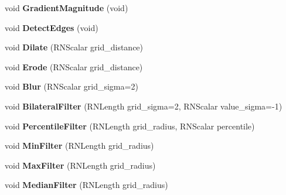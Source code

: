 \begin{DoxyCompactItemize}
\item 
void {\bfseries Gradient\+Magnitude} (void)\hypertarget{class_r3_grid_ac3e7a5b7c4e57a3df01e0b3df49c1ae5}{}\label{class_r3_grid_ac3e7a5b7c4e57a3df01e0b3df49c1ae5}

\item 
void {\bfseries Detect\+Edges} (void)\hypertarget{class_r3_grid_ac28e72ecc029f51ba86351f652d388b7}{}\label{class_r3_grid_ac28e72ecc029f51ba86351f652d388b7}

\item 
void {\bfseries Dilate} (R\+N\+Scalar grid\+\_\+distance)\hypertarget{class_r3_grid_a8adc3216f57c35fca6cc334658222073}{}\label{class_r3_grid_a8adc3216f57c35fca6cc334658222073}

\item 
void {\bfseries Erode} (R\+N\+Scalar grid\+\_\+distance)\hypertarget{class_r3_grid_a053615b5dfd296d03de9d3342a5bd69b}{}\label{class_r3_grid_a053615b5dfd296d03de9d3342a5bd69b}

\item 
void {\bfseries Blur} (R\+N\+Scalar grid\+\_\+sigma=2)\hypertarget{class_r3_grid_a173ed5e2e752422fd12fc560fe0d8d70}{}\label{class_r3_grid_a173ed5e2e752422fd12fc560fe0d8d70}

\item 
void {\bfseries Bilateral\+Filter} (R\+N\+Length grid\+\_\+sigma=2, R\+N\+Scalar value\+\_\+sigma=-\/1)\hypertarget{class_r3_grid_a1316c3649f21bd00e1ca016ce1ce1caf}{}\label{class_r3_grid_a1316c3649f21bd00e1ca016ce1ce1caf}

\item 
void {\bfseries Percentile\+Filter} (R\+N\+Length grid\+\_\+radius, R\+N\+Scalar percentile)\hypertarget{class_r3_grid_a511d9bb2e6eaa42c9c0e917009da90b1}{}\label{class_r3_grid_a511d9bb2e6eaa42c9c0e917009da90b1}

\item 
void {\bfseries Min\+Filter} (R\+N\+Length grid\+\_\+radius)\hypertarget{class_r3_grid_aa2b97236e2b43359023f47634ac098fe}{}\label{class_r3_grid_aa2b97236e2b43359023f47634ac098fe}

\item 
void {\bfseries Max\+Filter} (R\+N\+Length grid\+\_\+radius)\hypertarget{class_r3_grid_ac54562bc053bbfde118e58f2411b089a}{}\label{class_r3_grid_ac54562bc053bbfde118e58f2411b089a}

\item 
void {\bfseries Median\+Filter} (R\+N\+Length grid\+\_\+radius)\hypertarget{class_r3_grid_a7e88ed91dc5c72b0ee9b62966c29715d}{}\label{class_r3_grid_a7e88ed91dc5c72b0ee9b62966c29715d}


\end{DoxyCompactItemize}
